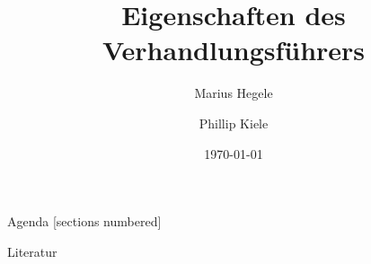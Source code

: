 \documentclass[10pt]{beamer}
\title{Eigenschaften des Verhandlungsführers}
\date{\today}
\author{Marius Hegele \and Phillip Kiele}
\institute{Consulting TINF17A\\DHBW Stuttgart}
\begin{document}
	
	\begin{frame}[plain]
		\maketitle
	\end{frame}
	
	\begin{frame}{Agenda}
		[sections numbered]
		\tableofcontents[hideallsubsections]
	\end{frame}

	
	

	\appendix

	\begin{frame}[plain]
		\maketitle
	\end{frame}

	\begin{frame}[allowframebreaks]{Literatur}
		\printbibliography[heading = none]
	\end{frame}
\end{document}
